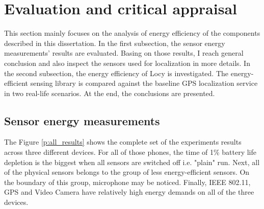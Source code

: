 \section{Evaluation and critical appraisal}
\label{s:evaluation}

\hspace{10pt} This section mainly focuses on the analysis of energy efficiency of the components described in this dissertation. In the first subsection, the sensor energy measurements' results are evaluated. Basing on those results, I reach general conclusion and also inspect the sensors used for localization in more details. In the second subsection, the energy efficiency of Locy is investigated. The energy-efficient sensing library is compared against the baseline GPS localization service in two real-life scenarios. At the end, the conclusions are presented.

\subsection{Sensor energy measurements}

\hspace{10pt} The Figure \ref{p:all_results} shows the complete set of the experiments results across three different devices. For all of those phones, the time of 1\% battery life depletion is the biggest when all sensors are switched off i.e. "plain" run. Next, all of the physical sensors belongs to the group of less energy-efficient sensors. On the boundary of this group, microphone may be noticed. Finally, IEEE 802.11, GPS and Video Camera have relatively high energy demands on all of the three devices.

